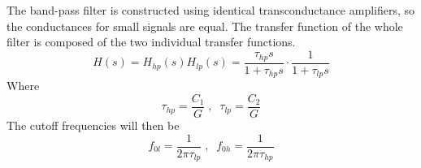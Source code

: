 The band-pass filter is constructed using identical transconductance amplifiers, so the conductances for small signals are equal. The transfer
function of the whole filter is composed of the two individual transfer functions.
\begin{equation*}
    H(s) = H_{hp}(s)H_{lp}(s) = \frac{\tau_{hp}s}{1+\tau_{hp}s}\cdot\frac{1}{1+\tau_{lp}s}
\end{equation*}
Where
\begin{equation*}
    \tau_{hp} = \frac{C_1}{G} \;,\;\; \tau_{lp} = \frac{C_2}{G}
\end{equation*}
The cutoff frequencies will then be
\begin{equation*}
    f_{0l} = \frac{1}{2\pi\tau_{lp}} \;,\;\; f_{0h} = \frac{1}{2\pi\tau_{hp}}
\end{equation*}

